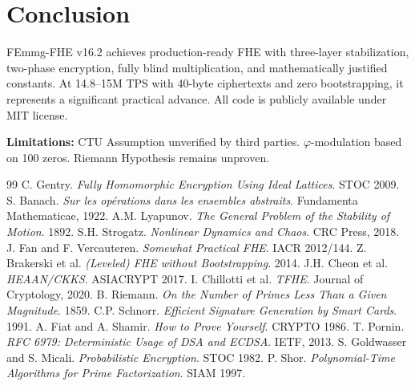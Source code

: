 \documentclass{article}
\begin{document}
\section{Conclusion}

FEmmg-FHE v16.2 achieves production-ready FHE with three-layer stabilization, two-phase encryption, fully blind multiplication, and mathematically justified constants. At 14.8--15M TPS with 40-byte ciphertexts and zero bootstrapping, it represents a significant practical advance. All code is publicly available under MIT license.

\textbf{Limitations:} CTU Assumption unverified by third parties. $\varphi$-modulation based on 100 zeros. Riemann Hypothesis remains unproven.

\begin{thebibliography}{99}
 C. Gentry. \textit{Fully Homomorphic Encryption Using Ideal Lattices}. STOC 2009.
 S. Banach. \textit{Sur les op\'erations dans les ensembles abstraits}. Fundamenta Mathematicae, 1922.
 A.M. Lyapunov. \textit{The General Problem of the Stability of Motion}. 1892.
 S.H. Strogatz. \textit{Nonlinear Dynamics and Chaos}. CRC Press, 2018.
 J. Fan and F. Vercauteren. \textit{Somewhat Practical FHE}. IACR 2012/144.
 Z. Brakerski et al. \textit{(Leveled) FHE without Bootstrapping}. 2014.
 J.H. Cheon et al. \textit{HEAAN/CKKS}. ASIACRYPT 2017.
 I. Chillotti et al. \textit{TFHE}. Journal of Cryptology, 2020.
 B. Riemann. \textit{On the Number of Primes Less Than a Given Magnitude}. 1859.
 C.P. Schnorr. \textit{Efficient Signature Generation by Smart Cards}. 1991.
 A. Fiat and A. Shamir. \textit{How to Prove Yourself}. CRYPTO 1986.
 T. Pornin. \textit{RFC 6979: Deterministic Usage of DSA and ECDSA}. IETF, 2013.
 S. Goldwasser and S. Micali. \textit{Probabilistic Encryption}. STOC 1982.
 P. Shor. \textit{Polynomial-Time Algorithms for Prime Factorization}. SIAM 1997.
\end{thebibliography}
\end{document}

